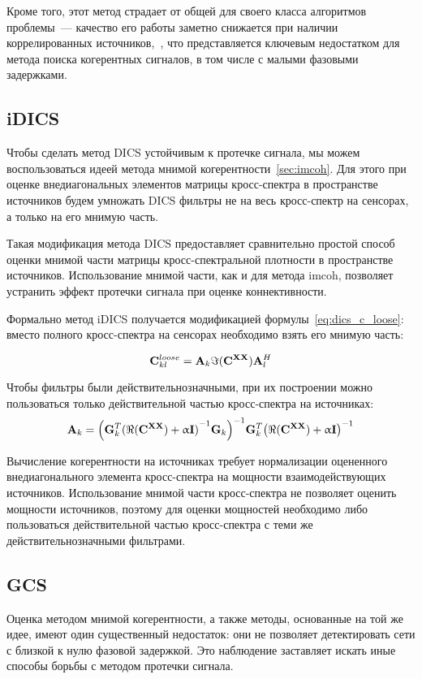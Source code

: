 Кроме того, этот метод страдает от общей для своего класса алгоритмов проблемы~---
качество его работы заметно снижается при наличии коррелированных источников,~\cite{VanVeen1997},
что представляется ключевым недостатком для метода поиска когерентных сигналов, в том
числе с малыми фазовыми задержками.

\subsection{iDICS}\label{subsec:iDICS}
Чтобы сделать метод DICS устойчивым к протечке сигнала, мы можем воспользоваться
идеей метода мнимой когерентности~\ref{sec:imcoh}. Для этого при оценке внедиагональных
элементов матрицы кросс-спектра в пространстве источников будем умножать DICS фильтры
не на весь кросс-спектр на сенсорах, а только на его мнимую часть.

Такая модификация метода DICS предоставляет сравнительно простой способ
оценки мнимой части матрицы кросс-спектральной плотности в пространстве
источников. Использование мнимой части, как и для метода imcoh, позволяет
устранить эффект протечки сигнала при оценке коннективности.

Формально метод iDICS получается модификацией формулы~\ref{eq:dics_c_loose}:
вместо полного кросс-спектра на сенсорах необходимо взять его мнимую часть:

\begin{equation}
    \mathbf{C}^{loose}_{kl} = \mathbf{A}_k \Im(\mathbf{C}^{\mathbf{X X}}) \mathbf{A}_l^H
    \label{eq:idics_c_loose}
\end{equation}

Чтобы фильтры были действительнозначными, при их построении
можно пользоваться только действительной частью кросс-спектра на источниках:
\begin{equation}
    \mathbf{A}_k =
    {\left(\mathbf{G}_k^T {(\Re(\mathbf{C}^{\mathbf{X X}}) + \upalpha \mathbf{I})}^{-1} \mathbf{G}_k\right)}^{-1}
    \mathbf{G}_k^T {\left(\Re(\mathbf{C}^{\mathbf{X X}}) + \upalpha \mathbf{I}\right)}^{-1}
    \label{eq:idics_filters}
\end{equation}

Вычисление когерентности на источниках требует нормализации оцененного
внедиагонального элемента кросс-спектра на мощности взаимодействующих
источников. Использование мнимой части кросс-спектра не позволяет
оценить мощности источников, поэтому для оценки мощностей необходимо либо
пользоваться действительной частью кросс-спектра с теми же действительнозначными
фильтрами.


\subsection{GCS}\label{subsec:GCS}
Оценка методом мнимой когерентности, а также методы, основанные на 
той же идее, имеют один существенный недостаток: они не позволяет
детектировать сети с близкой к нулю фазовой задержкой. Это наблюдение
заставляет искать иные способы борьбы с методом протечки сигнала.

